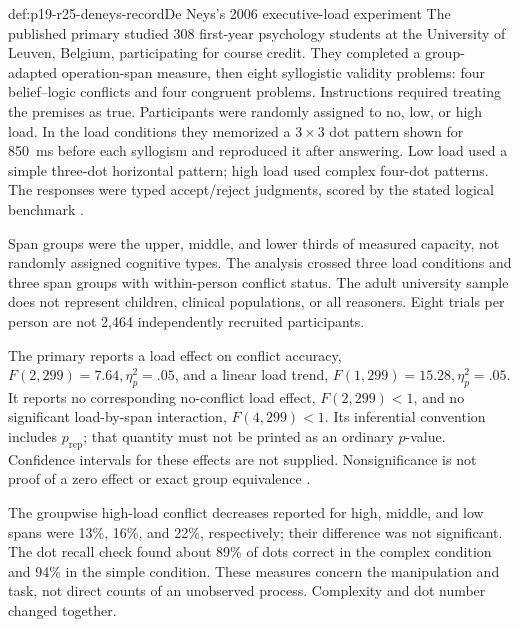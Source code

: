 \begin{hbdefinition}{def:p19-r25-deneys-record}{De Neys's 2006 executive-load experiment}
The published primary studied 308 first-year psychology students at
the University of Leuven, Belgium, participating for course credit.
They completed a group-adapted operation-span measure, then eight
syllogistic validity problems: four belief--logic conflicts and four
congruent problems. Instructions required treating the premises as true.
Participants were randomly assigned to no, low, or high load. In the
load conditions they memorized a \(3\times3\) dot pattern shown for
850~ms before each syllogism and reproduced it after answering. Low
load used a simple three-dot horizontal pattern; high load used complex
four-dot patterns. The responses were typed accept/reject judgments,
scored by the stated logical benchmark
\cite[pp.~429--430]{DeNeys2006DualProcessing}.

Span groups were the upper, middle, and lower thirds of measured capacity,
not randomly assigned cognitive types. The analysis crossed three load
conditions and three span groups with within-person conflict status.
The adult university sample does not represent children, clinical
populations, or all reasoners. Eight trials per person are not 2,464
independently recruited participants.
\end{hbdefinition}

The primary reports a load effect on conflict accuracy,
\(F(2,299)=7.64,\eta_p^2=.05\), and a linear load trend,
\(F(1,299)=15.28,\eta_p^2=.05\). It reports no corresponding
no-conflict load effect, \(F(2,299)<1\), and no significant load-by-span
interaction, \(F(4,299)<1\). Its inferential convention includes
\(p_{\mathrm{rep}}\); that quantity must not be printed as an ordinary
\(p\)-value. Confidence intervals for these effects are not supplied.
Nonsignificance is not proof of a zero effect or exact group equivalence
\cite[pp.~430--431]{DeNeys2006DualProcessing}.

The groupwise high-load conflict decreases reported for high, middle,
and low spans were 13\%, 16\%, and 22\%, respectively; their difference
was not significant. The dot recall check found about 89\% of dots
correct in the complex condition and 94\% in the simple condition.
These measures concern the manipulation and task, not direct counts
of an unobserved process. Complexity and dot number changed together.

